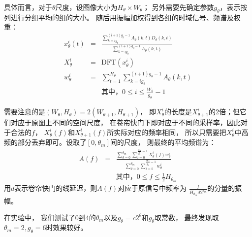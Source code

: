 具体而言，对于$\theta$尺度，设图像大小为$H_\theta \times W_\theta$；
另外需要先确定参数$g_\theta$，表示按列进行分组平均的组的大小。
随后用振幅加权得到各组的时域信号、频谱及权重：
\begin{eqnarray}
    x_\theta^i(t) &=& \frac{\sum_{k=ig_\theta}^{(i+1)g_\theta-1}
    A_\theta(k, t)D_\theta(k, t)}
        {\sum_{k=ig_\theta}^{(i+1)g_\theta-1}A_\theta(k, t)} \\
    X_\theta^i &=& \text{DFT}(x_\theta^i) \\
    w_\theta^i &=& \sum_{t=1}^{H_\theta}
        {\sum_{k=ig_\theta}^{(i+1)g_\theta-1}A_\theta(k, t)} \\
    && \text{其中，} 0 \le i \le \frac{W_\theta}{g_\theta} - 1 \nonumber
\end{eqnarray}

需要注意的是$(W_\theta, H_\theta) = 2(W_{\theta+1}, H_{\theta+1})$，
即$X_\theta^i$的长度是$X_{\theta+1}^i$的2倍；但它们对应于原图上不同的空间尺度，
在卷帘快门下即对应于不同的采样率，因此对于合法的$f$，
$X_\theta^i(f)$和$X_{\theta+1}^i(f)$所实际对应的频率相同，
所以只需要把$X_\theta^i$中高频的部分丢弃即可。设取了$[0, \theta_m]$间的尺度，
则最终的平均频谱为：
\begin{eqnarray}
    A(f) &=& \frac{\sum_{\theta=0}^{\theta_m}
    \sum_{i=0}^{\frac{W_\theta}{g_\theta} - 1}X_\theta^i(f)w_\theta^i}
    {\sum_{\theta=0}^{\theta_m}
    \sum_{i=0}^{\frac{W_\theta}{g_\theta} - 1}w_\theta^i} \\
    && \text{其中，} 0 \le f \le \frac{1}{2}H_{\theta_m} \nonumber
\end{eqnarray}
用$d$表示卷帘快门的线延迟，则$A(f)$对应于原信号中频率为
$\frac{f}{H_{\theta_m}d2^{\theta_m}}$的分量的振幅。

在实验中，
我们测试了$0$到$4$的$\theta_m$以及$g_\theta=c2^\theta$和$g_\theta$取常数，
最终发现取$\theta_m=2, g_\theta=6$时效果较好。




